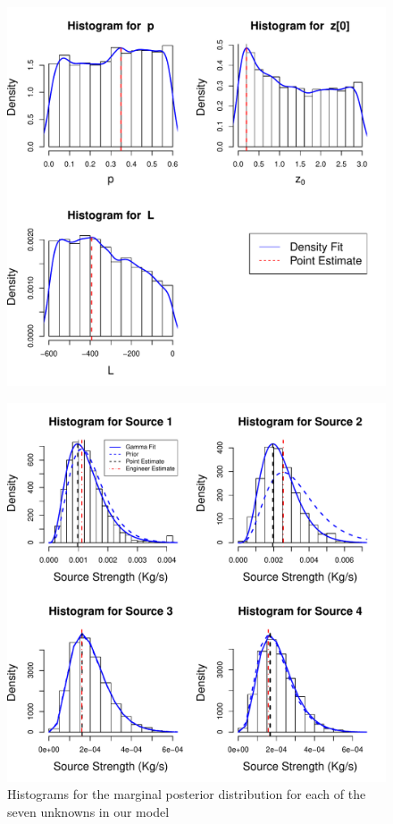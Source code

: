 \documentclass{sfuthesis}
\begin{document}
\begin{figure}[H]
\centering
\includegraphics[scale=0.45]{./FigChap4/histogramsI}
\label{figHistograms}
\end{figure}
\begin{figure}[H]
\centering
\includegraphics[scale=0.55]{./FigChap4/histogramsII}
\caption{Histograms for the marginal posterior distribution for each of the seven unknowns in our model}
\label{figHistograms}
\end{figure}
\end{document}
